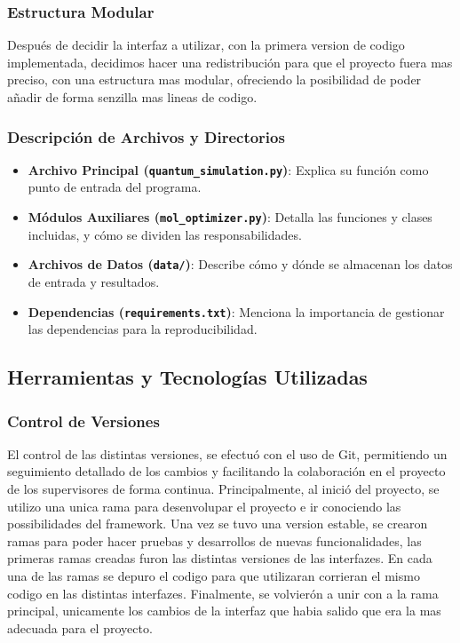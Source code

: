 \subsubsection{Estructura Modular}
Después de decidir la interfaz a utilizar, con la primera version de codigo implementada, decidimos hacer una redistribución para que el proyecto fuera mas preciso, con una estructura mas modular, ofreciendo la posibilidad de poder añadir de forma senzilla mas lineas de codigo.

\subsubsection{Descripción de Archivos y Directorios}

\begin{itemize}
    \item \textbf{Archivo Principal (\texttt{quantum\_simulation.py})}: Explica su función como punto de entrada del programa.
    \item \textbf{Módulos Auxiliares (\texttt{mol\_optimizer.py})}: Detalla las funciones y clases incluidas, y cómo se dividen las responsabilidades.
    \item \textbf{Archivos de Datos (\texttt{data/})}: Describe cómo y dónde se almacenan los datos de entrada y resultados.
    \item \textbf{Dependencias (\texttt{requirements.txt})}: Menciona la importancia de gestionar las dependencias para la reproducibilidad.
\end{itemize}

\subsection{Herramientas y Tecnologías Utilizadas}

\subsubsection{Control de Versiones}
El control de las distintas versiones, se efectuó con el uso de Git, permitiendo un seguimiento detallado de los cambios y facilitando la colaboración en el proyecto de los supervisores de forma continua.  Principalmente, al inició del proyecto, se utilizo una unica rama para desenvolupar el proyecto e ir conociendo las possibilidades del framework. Una vez se tuvo una version estable, se crearon ramas para poder hacer pruebas y desarrollos de nuevas funcionalidades, las primeras ramas creadas furon las distintas versiones de las interfazes. En cada una de las ramas se depuro el codigo para que utilizaran corrieran el mismo codigo en las distintas interfazes. Finalmente, se volvierón a unir con a la rama principal, unicamente los cambios de la interfaz que habia salido que era la mas adecuada para el proyecto.


